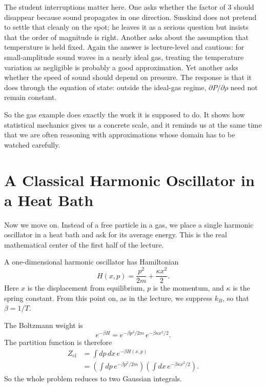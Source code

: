 The student interruptions matter here. One asks whether the factor of \(3\) should disappear because sound propagates in one direction. Susskind does not pretend to settle that cleanly on the spot; he leaves it as a serious question but insists that the order of magnitude is right. Another asks about the assumption that temperature is held fixed. Again the answer is lecture-level and cautious: for small-amplitude sound waves in a nearly ideal gas, treating the temperature variation as negligible is probably a good approximation. Yet another asks whether the speed of sound should depend on pressure. The response is that it does through the equation of state: outside the ideal-gas regime, \(\partial P/\partial \rho\) need not remain constant.

So the gas example does exactly the work it is supposed to do. It shows how statistical mechanics gives us a concrete scale, and it reminds us at the same time that we are often reasoning with approximations whose domain has to be watched carefully.

\section{A Classical Harmonic Oscillator in a Heat Bath}

Now we move on. Instead of a free particle in a gas, we place a single harmonic oscillator in a heat bath and ask for its average energy. This is the real mathematical center of the first half of the lecture.

A one-dimensional harmonic oscillator has Hamiltonian
\begin{equation}
H(x,p)=\frac{p^2}{2m}+\frac{\kappa x^2}{2}.
\end{equation}
Here \(x\) is the displacement from equilibrium, \(p\) is the momentum, and \(\kappa\) is the spring constant. From this point on, as in the lecture, we suppress \(k_B\), so that \(\beta=1/T\).

The Boltzmann weight is
\begin{equation}
e^{-\beta H}=e^{-\beta p^2/2m}\,e^{-\beta \kappa x^2/2}.
\end{equation}
The partition function is therefore
\begin{align}
Z_{\mathrm{cl}}
&=\int dp\,dx\,e^{-\beta H(x,p)} \\
&=\left(\int dp\,e^{-\beta p^2/2m}\right)
  \left(\int dx\,e^{-\beta \kappa x^2/2}\right).
\end{align}
So the whole problem reduces to two Gaussian integrals.

